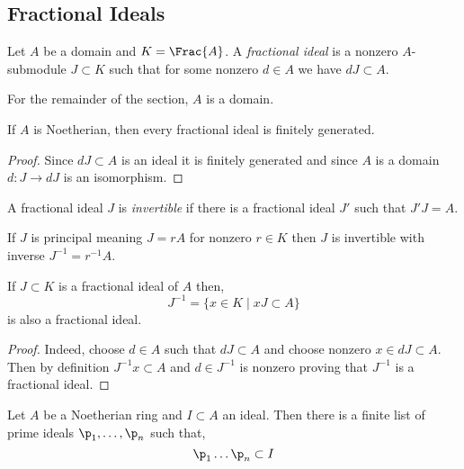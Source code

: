 \documentclass[12pt]{article}
\begin{document}
\subsection{Fractional Ideals}

\begin{defn}
Let $A$ be a domain and $K = \Frac{A}$. A \textit{fractional ideal} is a nonzero $A$-submodule $J \subset K$ such that for some nonzero $d \in A$ we have $d J \subset A$.
\end{defn}

\begin{rmk}
For the remainder of the section, $A$ is a domain.
\end{rmk}

\begin{prop}
If $A$ is Noetherian, then every fractional ideal is finitely generated.
\end{prop}

\begin{proof}
Since $d J \subset A$ is an ideal it is finitely generated and since $A$ is a domain $d : J \to d J$ is an isomorphism. 
\end{proof}

\begin{defn}
A fractional ideal $J$ is \textit{invertible} if there is a fractional ideal $J'$ such that $J' J = A$.
\end{defn}

\begin{rmk}
If $J$ is principal meaning $J = r A$ for nonzero $r \in K$ then $J$ is invertible with inverse $J^{-1} = r^{-1} A$.
\end{rmk}

\begin{prop}
If $J \subset K$ is a fractional ideal of $A$ then,
\[ J^{-1} = \{ x \in K \mid x J \subset A \} \]
is also a fractional ideal. 
\end{prop}

\begin{proof}
Indeed, choose $d \in A$ such that $d J \subset A$ and choose nonzero $x \in d J \subset A$. Then by definition $J^{-1} x \subset A$ and $d \in J^{-1}$ is nonzero proving that $J^{-1}$ is a fractional ideal. 
\end{proof}

\begin{lemma}
Let $A$ be a Noetherian ring and $I \subset A$ an ideal. Then there is a finite list of prime ideals $\p_1, \dots, \p_n$ such that,
\[ \p_1 \dots \p_n \subset I \]
\end{lemma}
\end{document}
